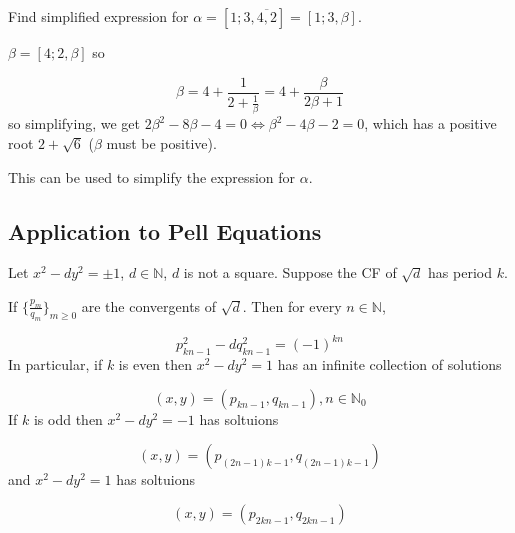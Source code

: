 \begin{example}
	Find simplified expression for $\alpha = [1; 3, \overline{4, 2}] = [1; 3, \beta]$.

	$\beta = [4; 2, \beta]$ so

	\[ \beta = 4 + \frac{1}{2 + \frac{1}{\beta}} = 4 + \frac{\beta}{2 \beta + 1} \]
	so simplifying, we get $ 2\beta^2 - 8\beta - 4 = 0 \Leftrightarrow \beta^2 - 4\beta - 2 = 0$, which has a positive root $2 + \sqrt{6}$ ($\beta$ must be positive).

	This can be used to simplify the expression for $\alpha$.
\end{example}

\subsection{Application to Pell Equations}

\begin{theorem}
	Let $x^2 - d y^2 = \pm 1$, $d \in \mathbb{N}$, $d$ is not a square. Suppose the CF of $\sqrt{d}$ has period $k$.

	If $\{\frac{p_m}{q_m}\}_{m \ge 0}$ are the convergents of $\sqrt{d}$. Then for every $n \in \mathbb{N}$,

	\[ p_{kn - 1}^2 - d q_{kn - 1}^2 = {(-1)}^{k n} \]
	In particular, if $k$ is even then $x^2 - d y^2 = 1$ has an infinite collection of solutions

	\[ (x, y) = (p_{kn - 1}, q_{kn - 1}), n \in \mathbb{N}_0 \]
	If $k$ is odd then $x^2 - d y^2 = -1$ has soltuions

	\[ (x, y) = (p_{(2n - 1)k - 1}, q_{(2n - 1)k - 1}) \]
	and $x^2 - dy^2 = 1$ has soltuions

	\[ (x, y) = (p_{2kn - 1}, q_{2kn - 1}) \]
\end{theorem}

